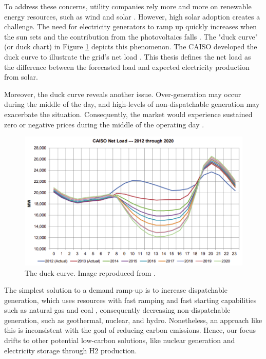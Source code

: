 To address these concerns, utility companies rely more and more on renewable energy resources, such as wind and solar \cite{ming_resource_2019}.
However, high solar adoption creates a challenge.
The need for electricity generators to ramp up quickly increases when the sun sets and the contribution from the photovoltaics falls \cite{us_department_of_energy_confronting_2017}.
The "duck curve" (or duck chart) in Figure \ref{fig:duck} depicts this phenomenon.
The \gls{CAISO} developed the duck curve to illustrate the grid's net load \cite{bouillon_prepared_2014}.
This thesis defines the net load as the difference between the forecasted load and expected electricity production from solar.

Moreover, the duck curve reveals another issue.
Over-generation may occur during the middle of the day, and high-levels of non-dispatchable generation may exacerbate the situation.
Consequently, the market would experience sustained zero or negative prices during the middle of the operating day \cite{bouillon_prepared_2014}.

\begin{figure}[htbp!]
	\centering
	\includegraphics[width=0.75\linewidth]{figures-hydro/caiso-duck.png}
	\hfill
	\caption{The duck curve. Image reproduced from \cite{bouillon_prepared_2014}.}
	\label{fig:duck}
\end{figure}

The simplest solution to a demand ramp-up is to increase dispatchable generation, which uses resources with fast ramping and fast starting capabilities such as natural gas and coal \cite{bouillon_prepared_2014}, consequently decreasing non-dispatchable generation, such as geothermal, nuclear, and hydro.
Nonetheless, an approach like this is inconsistent with the goal of reducing carbon emissions.
Hence, our focus drifts to other potential low-carbon solutions, like nuclear generation and electricity storage through \gls{H2} production.

